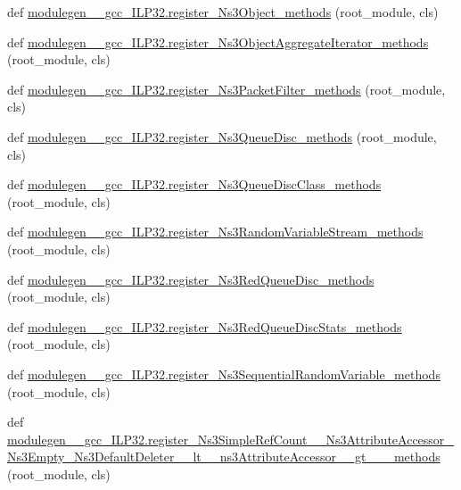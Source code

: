 \begin{DoxyCompactItemize}
\item 
def \hyperlink{namespacemodulegen____gcc__ILP32_a214a6e153873bc8ca6880fc3f4cb4cb0}{modulegen\+\_\+\+\_\+gcc\+\_\+\+I\+L\+P32.\+register\+\_\+\+Ns3\+Object\+\_\+methods} (root\+\_\+module, cls)
\item 
def \hyperlink{namespacemodulegen____gcc__ILP32_aa803b137018709bb9ce4e0561d4ce0c7}{modulegen\+\_\+\+\_\+gcc\+\_\+\+I\+L\+P32.\+register\+\_\+\+Ns3\+Object\+Aggregate\+Iterator\+\_\+methods} (root\+\_\+module, cls)
\item 
def \hyperlink{namespacemodulegen____gcc__ILP32_acc9f2b07706b9660cc6967b12d8ee22b}{modulegen\+\_\+\+\_\+gcc\+\_\+\+I\+L\+P32.\+register\+\_\+\+Ns3\+Packet\+Filter\+\_\+methods} (root\+\_\+module, cls)
\item 
def \hyperlink{namespacemodulegen____gcc__ILP32_a0b34a2548e90f6701b33c389f95dbd51}{modulegen\+\_\+\+\_\+gcc\+\_\+\+I\+L\+P32.\+register\+\_\+\+Ns3\+Queue\+Disc\+\_\+methods} (root\+\_\+module, cls)
\item 
def \hyperlink{namespacemodulegen____gcc__ILP32_ab230fd22917dfb782ecb446e6a218491}{modulegen\+\_\+\+\_\+gcc\+\_\+\+I\+L\+P32.\+register\+\_\+\+Ns3\+Queue\+Disc\+Class\+\_\+methods} (root\+\_\+module, cls)
\item 
def \hyperlink{namespacemodulegen____gcc__ILP32_a8a007a5dc41faf281d3870b3feee4669}{modulegen\+\_\+\+\_\+gcc\+\_\+\+I\+L\+P32.\+register\+\_\+\+Ns3\+Random\+Variable\+Stream\+\_\+methods} (root\+\_\+module, cls)
\item 
def \hyperlink{namespacemodulegen____gcc__ILP32_a31ad5b212a69e76640db41020cd102f2}{modulegen\+\_\+\+\_\+gcc\+\_\+\+I\+L\+P32.\+register\+\_\+\+Ns3\+Red\+Queue\+Disc\+\_\+methods} (root\+\_\+module, cls)
\item 
def \hyperlink{namespacemodulegen____gcc__ILP32_a9289b2a29a0ef10b0adc7cdbe3ddaeac}{modulegen\+\_\+\+\_\+gcc\+\_\+\+I\+L\+P32.\+register\+\_\+\+Ns3\+Red\+Queue\+Disc\+Stats\+\_\+methods} (root\+\_\+module, cls)
\item 
def \hyperlink{namespacemodulegen____gcc__ILP32_a977006b47ef349be03ea356cf805516c}{modulegen\+\_\+\+\_\+gcc\+\_\+\+I\+L\+P32.\+register\+\_\+\+Ns3\+Sequential\+Random\+Variable\+\_\+methods} (root\+\_\+module, cls)
\item 
def \hyperlink{namespacemodulegen____gcc__ILP32_ac3ab36c44430c9b0f0301233bd18935b}{modulegen\+\_\+\+\_\+gcc\+\_\+\+I\+L\+P32.\+register\+\_\+\+Ns3\+Simple\+Ref\+Count\+\_\+\+\_\+\+Ns3\+Attribute\+Accessor\+\_\+\+Ns3\+Empty\+\_\+\+Ns3\+Default\+Deleter\+\_\+\+\_\+lt\+\_\+\+\_\+ns3\+Attribute\+Accessor\+\_\+\+\_\+gt\+\_\+\+\_\+\+\_\+methods} (root\+\_\+module, cls)

\end{DoxyCompactItemize}
